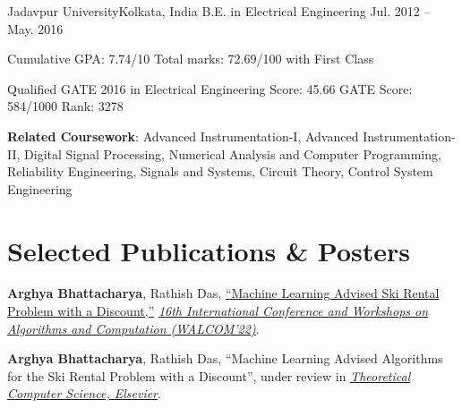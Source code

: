 \documentclass[letterpaper,10pt]{article}
\begin{document}
\resumeSubheading
{Jadavpur University}{Kolkata, India}
{B.E. in Electrical Engineering }{Jul. 2012 -- May. 2016}
\resumeItemListStart
\item {Cumulative GPA: 7.74/10 Total marks: 72.69/100 with First Class}
\item {Qualified GATE 2016 in Electrical Engineering Score: 45.66 GATE Score: 584/1000 Rank: 3278}
\item {\textbf{Related Coursework}: Advanced Instrumentation-I, Advanced Instrumentation-II, Digital Signal Processing, Numerical Analysis and Computer Programming, Reliability Engineering, Signals and Systems, Circuit Theory, Control System Engineering}
\resumeItemListEnd

\resumeSubHeadingListEnd 


\section{Selected Publications \& Posters}
\label{sec:pubs}
\resumeSubHeadingListStart
\item{\textbf{Arghya Bhattacharya}, Rathish Das, \href{https://link.springer.com/chapter/10.1007/978-3-030-96731-4_18}{``Machine Learning Advised Ski Rental Problem with a Discount,''} \href{https://walcom2022.unej.ac.id/instruction-for-author/accepted-papers}{\textit{16th International Conference and Workshops on Algorithms and Computation (WALCOM'22)}}.}

\item{\textbf{Arghya Bhattacharya}, Rathish Das, {``Machine Learning Advised Algorithms for the Ski Rental Problem with a Discount''}, under review in \href{https://www.sciencedirect.com/journal/theoretical-computer-science}{\textit{Theoretical Computer Science, Elsevier}}.}
\end{document}
